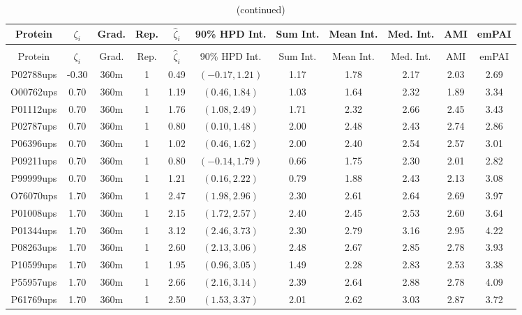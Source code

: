 \begin{landscape}
\begin{longtable}{cccc|cc|ccccc}
\caption{Detailed empirical results for UPS2 experiments, 360m gradient
\label{supp:proteomics:tab:ups2_360m}} \\
 Protein & $\zeta_i$ & Grad. & Rep. & $\hat{\zeta}_i$ & 90\% HPD Int. & Sum Int. & Mean Int. & Med. Int. & AMI & emPAI \\
\hline
\endfirsthead
\caption{(continued)} \\
 Protein & $\zeta_i$ & Grad. & Rep. & $\hat{\zeta}_i$ & 90\% HPD Int. & Sum Int. & Mean Int. & Med. Int. & AMI & emPAI \\
\hline
\endhead
P02788ups & -0.30 & 360m &   1 & 0.49 & $(-0.17, 1.21)$ & 1.17 & 1.78 & 2.17 & 2.03 & 2.69 \\ 
  O00762ups & 0.70 & 360m &   1 & 1.19 & $(0.46, 1.84)$ & 1.03 & 1.64 & 2.32 & 1.89 & 3.34 \\ 
  P01112ups & 0.70 & 360m &   1 & 1.76 & $(1.08, 2.49)$ & 1.71 & 2.32 & 2.66 & 2.45 & 3.43 \\ 
  P02787ups & 0.70 & 360m &   1 & 0.80 & $(0.10, 1.48)$ & 2.00 & 2.48 & 2.43 & 2.74 & 2.86 \\ 
  P06396ups & 0.70 & 360m &   1 & 1.02 & $(0.46, 1.62)$ & 2.00 & 2.40 & 2.54 & 2.57 & 3.01 \\ 
  P09211ups & 0.70 & 360m &   1 & 0.80 & $(-0.14, 1.79)$ & 0.66 & 1.75 & 2.30 & 2.01 & 2.82 \\ 
  P99999ups & 0.70 & 360m &   1 & 1.21 & $(0.16, 2.22)$ & 0.79 & 1.88 & 2.43 & 2.13 & 3.08 \\ 
  O76070ups & 1.70 & 360m &   1 & 2.47 & $(1.98, 2.96)$ & 2.30 & 2.61 & 2.64 & 2.69 & 3.97 \\ 
  P01008ups & 1.70 & 360m &   1 & 2.15 & $(1.72, 2.57)$ & 2.40 & 2.45 & 2.53 & 2.60 & 3.64 \\ 
  P01344ups & 1.70 & 360m &   1 & 3.12 & $(2.46, 3.73)$ & 2.30 & 2.79 & 3.16 & 2.95 & 4.22 \\ 
  P08263ups & 1.70 & 360m &   1 & 2.60 & $(2.13, 3.06)$ & 2.48 & 2.67 & 2.85 & 2.78 & 3.93 \\ 
  P10599ups & 1.70 & 360m &   1 & 1.95 & $(0.96, 3.05)$ & 1.49 & 2.28 & 2.83 & 2.53 & 3.38 \\ 
  P55957ups & 1.70 & 360m &   1 & 2.66 & $(2.16, 3.14)$ & 2.39 & 2.64 & 2.88 & 2.78 & 4.09 \\ 
  P61769ups & 1.70 & 360m &   1 & 2.50 & $(1.53, 3.37)$ & 2.01 & 2.62 & 3.03 & 2.87 & 3.72 \\ 

\end{longtable}
\end{landscape}
